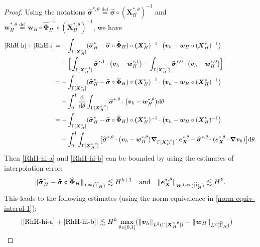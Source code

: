 \documentclass[11pt,reqno]{amsart}
\theoremstyle{definition}
\theoremstyle{plain}
\numberwithin{theorem}{section}
\numberwithin{proposition}{section}
\numberwithin{lemma}{section}
\numberwithin{equation}{section}
\newcommand{\bs}[1]{\boldsymbol{#1}}
\newcommand{\uu}[1]  {{\bs{#1}} }
\newcommand{\grad}   { \uu{\nabla}    }
\def\d{\mathrm{d}}
\newcommand{\bv}{{\bs v}}
\newcommand{\bw}{{\bs w}}
\renewcommand{\(}{\bigl(}
\renewcommand{\)}{\bigr)}
\def\eqd{\stackrel{\mathrm{def}}{=}}
\begin{document}
\begin{proof}
Using the notations $\widehat{\bs\sigma}^{*,\theta}\eqd \widehat{\bs\sigma} \circ ({\bs X}_H^{*,\theta})^{-1}$ and ${\bs w}_H^{*,\theta}\eqd {\bs w}_H \circ \widehat{\bs\Phi}_H^{-1} \circ ({\bs X}_H^{*,\theta})^{-1}$, we have 
\begin{subequations}
\begin{align}
\eqref{RhH-h} + \eqref{RhH-i} 
= & -  \int_{\Gamma[{\bs X}_H^*]} (\widehat{\bs \sigma} _H^* -\widehat{\bs\sigma}\circ\widehat{\bs\Phi}_H)\circ \bs ({\bs X}_H^*)^{-1} \cdot \big( \bv_h - \bw_H  \circ (\bs X_H^*)^{-1} \big) \notag\\
& - \Big[ \int_{\Gamma[{\bs X}_H^{*,1}]} \widehat{\bs\sigma}^{*,1} \cdot \big( \bv_h - \bw_H^{*,1} \big) - \int_{\Gamma[{\bs X}_H^{*,0}]} \widehat{\bs\sigma}^{*,0}  \cdot \big( \bv_h - \bw_H^{*,0} \big) \Big] \notag\\
= & -  \int_{\Gamma[{\bs X}_H^*]} (\widehat{\bs \sigma} _H^* -\widehat{\bs\sigma}\circ\widehat{\bs\Phi}_H)\circ \bs ({\bs X}_H^*)^{-1} \cdot \big( \bv_h - \bw_H  \circ (\bs X_H^*)^{-1} \big) \notag\\
& - \int_0^1 \frac{\d}{\d\theta} \int_{\Gamma[{\bs X}_H^{*,\theta}]} \widehat{\bs\sigma}^{*,\theta} \cdot \big( \bv_h - \bw_H^{*,\theta} \big) \d\theta \notag\\
= & -  \int_{\Gamma[{\bs X}_H^*]} (\widehat{\bs \sigma} _H^* -\widehat{\bs\sigma}\circ\widehat{\bs\Phi}_H)\circ \bs ({\bs X}_H^*)^{-1} \cdot \big( \bv_h - \bw_H  \circ (\bs X_H^*)^{-1} \big) \label{RhH-hi-a}\\
& - \int_0^1 \int_{\Gamma[{\bs X}_H^{*,\theta}]} \big[ \widehat{\bs\sigma}^{*,\theta} \cdot \big( \bv_h - \bw_H^{*,\theta} \big) \grad_{\Gamma[{\bs X}_H^{*,\theta}]}\cdot{\bs e}_{\bs X}^{*,\theta} 
+ \widehat{\bs\sigma}^{*,\theta} \cdot ({\bs e}_{\bs X}^{*,\theta} \cdot \grad \bv_h ) \big] \d\theta \label{RhH-hi-b} .
\end{align}
\end{subequations}
Then \eqref{RhH-hi-a} and \eqref{RhH-hi-b} can be bounded by using the estimates of interpolation error: 
$$
\|\widehat{\bs \sigma} _H^* - \widehat{\bs \sigma} \circ \widehat{\bs\Phi}_H\|_{L^\infty(\widehat\Gamma_H)} \lesssim H^{k+1} 
\quad\mbox{and}\quad
\| {\bs e}_{\bs X}^{*,\theta} \|_{W^{1,\infty}(\widehat{\Omega}^{\rm s}_H)} \lesssim H^k .
$$
This leads to the following estimates (using the norm equivalence in \eqref{norm-equiv-interpl-1}): 
\begin{align*}
|\eqref{RhH-hi-a} + \eqref{RhH-hi-b} | 
&\lesssim H^k 
 \max_{\theta\in[0,1]} ( \|{\bs v}_h\|_{L^2(\Gamma[{\bs X}_H^{*,\theta}])} + \|{\bs w}_H\|_{L^2(\widehat\Gamma_H)} ) 

\end{align*}
\end{proof}
\end{document}
